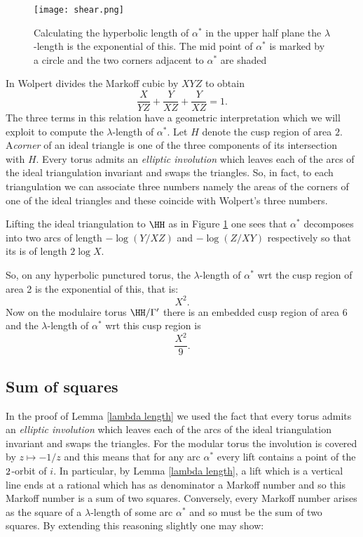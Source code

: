   \begin{figure}[ht]
\begin{center}
\texttt{[image: shear.png]} 
\end{center}
\caption{Calculating the hyperbolic length of $\alpha^*$ in the upper half plane
the $\lambda$-length is the exponential of this.
The mid point of $\alpha^*$ is marked by a circle and
the two corners adjacent to $\alpha^*$ are shaded}
\label{penner}
\end{figure}

In  \cite{saw} Wolpert divides the Markoff cubic by $XYZ$ to obtain
$$\frac{X}{YZ} + \frac{Y}{XZ} + \frac{Y}{XZ} = 1.$$
The three terms in this relation have a geometric interpretation
which we will exploit to compute the $\lambda$-length of $\alpha^*$.
Let $H$ denote the cusp region of area $2$. 
A\textit{corner} of an ideal triangle is one of the 
three components of its intersection with $H$.
Every torus admits an \textit{elliptic involution}
which leaves each of the arcs of the ideal triangulation  invariant
 and swaps the triangles.
So, in fact, to each triangulation we can associate three numbers
namely the areas of the corners of one of the  ideal triangles
and these coincide with Wolpert's three numbers.

Lifting the ideal triangulation to $\HH$ as in Figure \ref{penner}
one sees that  $\alpha^*$ decomposes into two arcs of length
$-\log(Y/XZ)$ and $-\log(Z/XY)$ respectively
so that its is of length $2\log X$.

So, on any hyperbolic punctured torus,
the $\lambda$-length of $\alpha^*$ wrt the cusp region of area 2 is
the exponential of this, that is:
$$ X^2.$$
Now on the modulaire torus $\HH/\Gamma'$ there is an embedded cusp 
region of area 6 and the $\lambda$-length of $\alpha^*$ wrt this cusp region
is
$$ \frac{X^2}{9}.$$



\subsection{Sum of squares}\label{frobenius}


In the proof of Lemma \ref{lambda length} 
we used the fact that
every torus admits an \textit{elliptic involution}
which leaves each of the arcs of the ideal triangulation  invariant
 and swaps the triangles.
For the modular torus the involution is covered by $z \mapsto -1/z$ 
and  this means that for any arc $\alpha^*$ every lift contains a point 
of the $\sl2$-orbit of $i$.
 In particular, by Lemma \ref{lambda length},
 a lift which is a vertical line ends at a rational 
 which has as denominator a Markoff number
 and so this Markoff number is a sum of two squares.
 Conversely, every Markoff number arises as the square of a $\lambda$-length
 of some arc  $\alpha^*$ and so must be the sum of two squares.
 By extending this reasoning slightly one may show:
 
